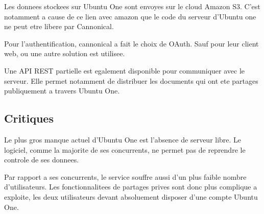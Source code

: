 Les donnees stockees sur Ubuntu One sont envoyes sur le cloud Amazon S3. C'est notamment a cause de ce lien avec amazon que le code du serveur d'Ubuntu one ne peut etre libere par Cannonical.

Pour l'authentification, cannonical a fait le choix de OAuth. Sauf pour leur client web, ou une autre solution est utilisee.

Une API REST partielle est egalement disponible pour communiquer avec le serveur. Elle permet notamment de distribuer les documents qui ont ete partages publiquement a travers Ubuntu One.

\subsection{Critiques}
Le plus gros manque actuel d'Ubuntu One est l'absence de serveur libre. Le logiciel, comme la majorite de ses concurrents, ne permet pas de reprendre le controle de ses donnees.

Par rapport a ses concurrents, le service souffre aussi d'un plus faible nombre d'utilisateurs. Les fonctionnalitees de partages prives sont donc plus complique a exploite, les deux utilisateurs devant absoluement disposer d'une compte Ubuntu One.
